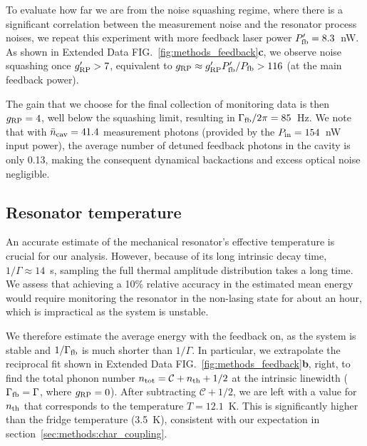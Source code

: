 \documentclass[./Main-revtex.tex]{subfiles}
\begin{document}
To evaluate how far we are from the noise squashing regime, where there is a significant correlation between the measurement noise and the resonator process noises, we repeat this experiment with more feedback laser power $P_\text{fb}' = 8.3$~nW. As shown in Extended Data FIG.~\ref{fig:methods_feedback}\textbf{c}, we observe noise squashing once $g_{\text{RP}}' > 7$, equivalent to $g_{\text{RP}} \approx g_{\text{RP}}' P_\text{fb}' / P_\text{fb} > 116$ (at the main feedback power).

The gain that we choose for the final collection of monitoring data is then $g_{\text{RP}} = 4$, well below the squashing limit, resulting in $\Gamma_\text{fb}/2\pi = 85$~Hz. We note that with $\bar{n}_\text{cav}=41.4$ measurement photons (provided by the $P_\text{in}=154$~nW input power), the average number of detuned feedback photons in the cavity is only 0.13, making the consequent dynamical backactions and excess optical noise negligible.

\subsection{Resonator temperature}
\label{sec:methods:mode_temperature}
An accurate estimate of the mechanical resonator’s effective temperature is crucial for our analysis. However, because of its long intrinsic decay time, $1/\Gamma \approx 14$~s, sampling the full thermal amplitude distribution takes a long time. We assess that achieving a 10\% relative accuracy in the estimated mean energy would require monitoring the resonator in the non-lasing state for about an hour, which is impractical as the system is unstable.

We therefore estimate the average energy with the feedback on, as the system is stable and $1/\Gamma_\text{fb}$ is much shorter than $1/\Gamma$. In particular, we extrapolate the reciprocal fit shown in Extended Data FIG.~\ref{fig:methods_feedback}\textbf{b}, right, to find the total phonon number $n_\text{tot} = \mathcal{C} + n_\text{th} + 1/2$ at the intrinsic linewidth ($\Gamma_\text{fb} = \Gamma$, where $g_{\text{RP}} = 0$). After subtracting $\mathcal{C} + 1/2$, we are left with a value for $n_\text{th}$ that corresponds to the temperature $T = 12.1$~K. This is significantly higher than the fridge temperature (3.5~K), consistent with our expectation in section~\ref{sec:methods:char_coupling}.
\end{document}
